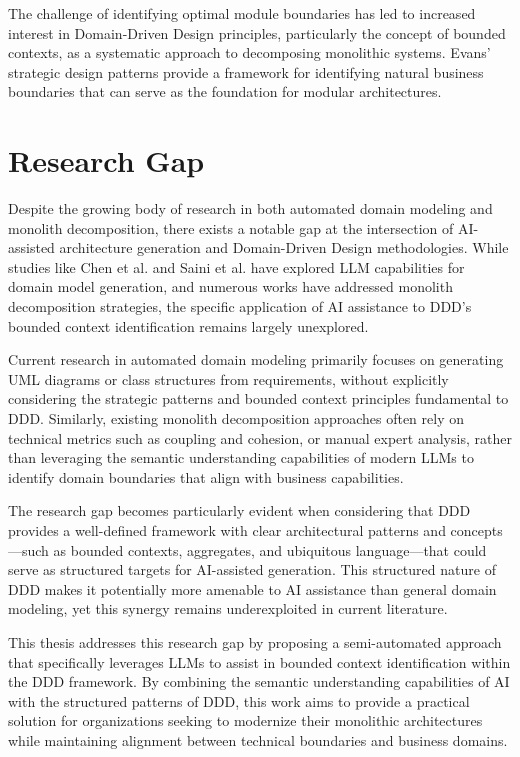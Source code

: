 The challenge of identifying optimal module boundaries has led to increased interest in Domain-Driven Design principles, particularly the concept of bounded contexts, as a systematic approach to decomposing monolithic systems. Evans' \autocite{evans2004domain} strategic design patterns provide a framework for identifying natural business boundaries that can serve as the foundation for modular architectures.


\section{Research Gap}
Despite the growing body of research in both automated domain modeling and monolith decomposition, there exists a notable gap at the intersection of AI-assisted architecture generation and Domain-Driven Design methodologies. While studies like Chen et al. \autocite{chen2023automated} and Saini et al. \autocite{Saini2022} have explored LLM capabilities for domain model generation, and numerous works have addressed monolith decomposition strategies, the specific application of AI assistance to DDD's bounded context identification remains largely unexplored.

Current research in automated domain modeling primarily focuses on generating UML diagrams or class structures from requirements, without explicitly considering the strategic patterns and bounded context principles fundamental to DDD. Similarly, existing monolith decomposition approaches often rely on technical metrics such as coupling and cohesion, or manual expert analysis, rather than leveraging the semantic understanding capabilities of modern LLMs to identify domain boundaries that align with business capabilities.

The research gap becomes particularly evident when considering that DDD provides a well-defined framework with clear architectural patterns and concepts—such as bounded contexts, aggregates, and ubiquitous language—that could serve as structured targets for AI-assisted generation. This structured nature of DDD makes it potentially more amenable to AI assistance than general domain modeling, yet this synergy remains underexploited in current literature.

This thesis addresses this research gap by proposing a semi-automated approach that specifically leverages LLMs to assist in bounded context identification within the DDD framework. By combining the semantic understanding capabilities of AI with the structured patterns of DDD, this work aims to provide a practical solution for organizations seeking to modernize their monolithic architectures while maintaining alignment between technical boundaries and business domains.